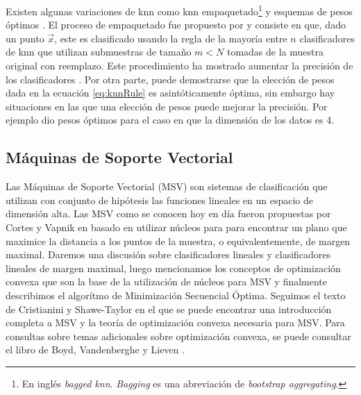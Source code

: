 \documentclass[letterpaper,12pt]{book}
\begin{document}
Existen algunas variaciones de knn como knn empaquetado\footnote{En inglés \textit{bagged knn}. \textit{Bagging} es una abreviación de \textit{bootstrap aggregating}.} \cite{breiman_heuristics_1996, breiman_bagging_1996} y esquemas de pesos óptimos \cite{samworth_optimal_2012}. El proceso de empaquetado fue propuesto por \cite{breiman_heuristics_1996, breiman_bagging_1996} y consiste en que, dado un punto $\vec{x}$, este es clasificado usando la regla de la mayoría entre $n$ clasificadores de knn que utilizan submuestras de tamaño $m<N$ tomadas de la muestra original con reemplazo. Este procedimiento ha mostrado aumentar la precisión de los clasificadores \cite{breiman_bagging_1996}. Por otra parte, puede demostrarse que la elección de pesos dada en la ecuación \ref{eq:knnRule} es asintóticamente óptima, sin embargo hay situaciones en las que una elección de pesos puede mejorar la precisión. Por ejemplo \cite{samworth_optimal_2012} dio pesos óptimos para el caso en que la dimensión de los datos es 4. 

\subsection{Máquinas de Soporte Vectorial}

Las Máquinas de Soporte Vectorial (MSV) son sistemas de clasificación que utilizan con conjunto de hipótesis las funciones lineales en un espacio de dimensión alta. Las MSV como se conocen hoy en día fueron propuestas por Cortes y Vapnik en \cite{cortes_support-vector_1995} basado en utilizar núcleos para para encontrar un plano que maximice la distancia a los puntos de la muestra, o equivalentemente, de margen maximal. Daremos una discusión sobre clasificadores lineales y clasificadores lineales de margen maximal, luego mencionamos los conceptos de optimización convexa que son la base de la utilización de núcleos para MSV y finalmente describimos el algorítmo de Minimización Secuencial Óptima. Seguimos el texto de Cristianini y Shawe-Taylor \cite{cristianini_introduction_2000} en el que se puede encontrar una introducción completa a MSV y la teoría de optimización convexa necesaria para MSV. Para consultas sobre temas adicionales sobre optimización convexa, se puede consultar el libro de Boyd, Vandenberghe y Lieven \cite{boyd_convex_2004}.
\end{document}
